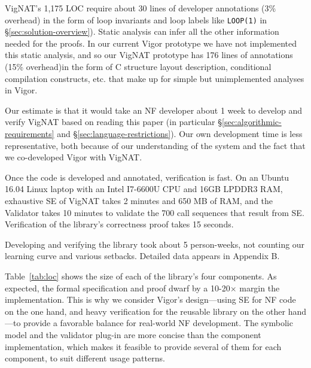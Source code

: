 \documentclass[letterpaper,twocolumn,10pt]{article}
\newcommand{\code}[1]{\lstinline{#1}}
\newcommand{\vignat}{{\sc VigNAT}\xspace}
\begin{document}
\vignat's 1,175 LOC require about 30 lines of developer annotations (3\%
overhead) in the form of loop invariants and loop labels like \code{LOOP(1)} in
\S\ref{sec:solution-overview}). Static analysis can infer all the other
information needed for the proofs. In our current Vigor prototype we have not
implemented this static analysis, and so our \vignat prototype has 176 lines of
annotations (15\% overhead)in the form of C structure layout description,
conditional compilation constructs, etc. that make up for simple but
unimplemented analyses in Vigor.

Our estimate is that it would take an NF developer about 1 week to develop and
verify \vignat based on reading this paper (in particular
\S\ref{sec:algorithmic-requirements} and \S\ref{sec:language-restrictions}). Our
own development time is less representative, both because of our understanding
of the system and the fact that we co-developed Vigor with \vignat.

Once the code is developed and annotated, verification is fast. On an Ubuntu
16.04 Linux laptop with an Intel I7-6600U CPU and 16GB LPDDR3 RAM, exhaustive SE
of \vignat takes 2 minutes and 650 MB of RAM, and the Validator takes 10 minutes
to validate the 700 call sequences that result from SE. Verification of the
library's correctness proof takes 15 seconds.

\medskip 

Developing and verifying the library took about 5 person-weeks, not counting our
learning curve and various setbacks. Detailed data appears in Appendix B.

Table~\ref{tab:loc} shows the size of each of the library's four components. As
expected, the formal specification and proof dwarf by a 10-20$\times$ margin the
implementation. This is why we consider Vigor's design---using SE for NF code on
the one hand, and heavy verification for the reusable library on the other
hand---to provide a favorable balance for real-world NF development. The
symbolic model and the validator plug-in are more concise than the component
implementation, which makes it feasible to provide several of them for each
component, to suit different usage patterns.
\end{document}
